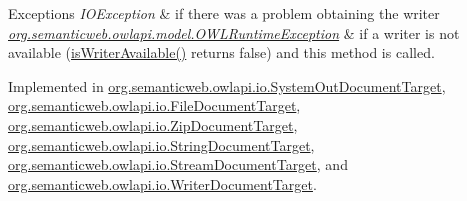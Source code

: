 \begin{DoxyExceptions}{Exceptions}
{\em I\-O\-Exception} & if there was a problem obtaining the writer \\
\hline
{\em \hyperlink{classorg_1_1semanticweb_1_1owlapi_1_1model_1_1_o_w_l_runtime_exception}{org.\-semanticweb.\-owlapi.\-model.\-O\-W\-L\-Runtime\-Exception}} & if a writer is not available (\hyperlink{interfaceorg_1_1semanticweb_1_1owlapi_1_1io_1_1_o_w_l_ontology_document_target_a8a756838f860363829bd24a351f78aaf}{is\-Writer\-Available()} returns {\ttfamily false}) and this method is called. \\
\hline
\end{DoxyExceptions}


Implemented in \hyperlink{classorg_1_1semanticweb_1_1owlapi_1_1io_1_1_system_out_document_target_adb7b8340b05974c04a602069a1816363}{org.\-semanticweb.\-owlapi.\-io.\-System\-Out\-Document\-Target}, \hyperlink{classorg_1_1semanticweb_1_1owlapi_1_1io_1_1_file_document_target_ab06431a03f2ce4a88b793ad9300337a6}{org.\-semanticweb.\-owlapi.\-io.\-File\-Document\-Target}, \hyperlink{classorg_1_1semanticweb_1_1owlapi_1_1io_1_1_zip_document_target_a3bee073451c79ceee04e81e4f75f1f58}{org.\-semanticweb.\-owlapi.\-io.\-Zip\-Document\-Target}, \hyperlink{classorg_1_1semanticweb_1_1owlapi_1_1io_1_1_string_document_target_adb54a613e4ca2bbb05654e3eefff40f7}{org.\-semanticweb.\-owlapi.\-io.\-String\-Document\-Target}, \hyperlink{classorg_1_1semanticweb_1_1owlapi_1_1io_1_1_stream_document_target_aa13fbea314b0029108874f0ad3fdeb9b}{org.\-semanticweb.\-owlapi.\-io.\-Stream\-Document\-Target}, and \hyperlink{classorg_1_1semanticweb_1_1owlapi_1_1io_1_1_writer_document_target_a16fb4aa8d2c7ff3d66b604796606df26}{org.\-semanticweb.\-owlapi.\-io.\-Writer\-Document\-Target}.

